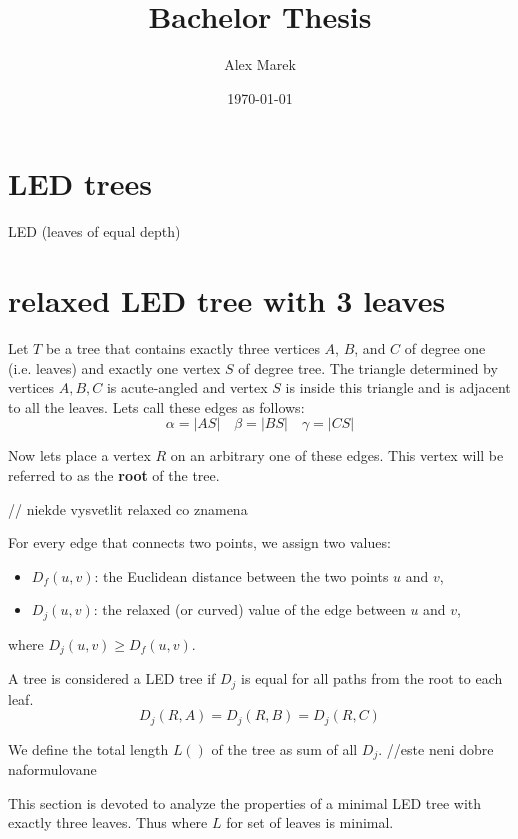 \documentclass[12pt]{article}
\title{Bachelor Thesis}
\author{Alex Marek}
\date{\today}
\begin{document}
	
	\maketitle
	
	\section*{LED trees}
	LED (leaves of equal depth)
	
	\maketitle
	
	\section*{relaxed LED tree with 3 leaves}
	
	Let \( T \) be a tree that contains exactly three vertices \( A \), \( B \), and \( C \) of degree one (i.e. leaves) and exactly one vertex \( S \) of degree tree.
	The triangle determined by vertices \( A , B , C \) is acute-angled and vertex \( S \) is inside this triangle and is adjacent to all the leaves. 
	Lets call these edges as follows:
	\[
	\alpha = |AS| \quad \beta = |BS| \quad \gamma = |CS|
	\]
		

	Now lets place a vertex \( R \) on an arbitrary one of these edges. This vertex will be referred to as the \textbf{root} of the tree.

	// niekde vysvetlit relaxed co znamena
	
	For every edge that connects two points, we assign two values:
	\begin{itemize}
	\item \( D_f(u, v) \): the Euclidean distance between the two points \( u \) and \( v \),
	\item \( D_j(u, v) \): the relaxed (or curved) value of the edge between \( u \) and \( v \),
	\end{itemize}
	where \( D_j(u, v) \geq D_f(u, v) \).
 	
	A tree is considered a LED tree if \( D_j \) is equal for all paths from the root to each leaf.
	\[
	D_j(R, A) = D_j(R, B) = D_j(R, C)
	\]
	
	We define the total length \( L() \) of the tree as sum of all \( D_j \). //este neni dobre naformulovane 
	
	This section is devoted to analyze the properties of a minimal LED tree with exactly three leaves.
 	Thus where \( L \) for set of leaves is minimal.
 	
\end{document}
